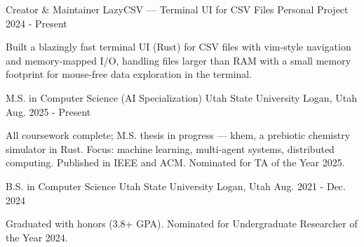 \documentclass[11pt, letterpaper]{awesome-cv}
\begin{document}
\begin{cventries}
  \cventry
    {Creator \& Maintainer}
    {LazyCSV --- Terminal UI for CSV Files}
    {Personal Project}
    {2024 - Present}
    {
      \begin{cvitems}
        \item {Built a blazingly fast terminal UI (Rust) for CSV files with vim-style navigation and memory-mapped I/O, handling files larger than RAM with a small memory footprint for mouse-free data exploration in the terminal.}
      \end{cvitems}
    }

\end{cventries}


\begin{cventries}

  \cventry
    {M.S. in Computer Science (AI Specialization)}
    {Utah State University}
    {Logan, Utah}
    {Aug. 2025 - Present}
    {
      \begin{cvitems}
        \item {All coursework complete; M.S. thesis in progress --- khem, a prebiotic chemistry simulator in Rust. Focus: machine learning, multi-agent systems, distributed computing. Published in IEEE and ACM. Nominated for TA of the Year 2025.}
      \end{cvitems}
    }

  \cventry
    {B.S. in Computer Science}
    {Utah State University}
    {Logan, Utah}
    {Aug. 2021 - Dec. 2024}
    {
      \begin{cvitems}
        \item {Graduated with honors (3.8+ GPA). Nominated for Undergraduate Researcher of the Year 2024.}
      \end{cvitems}
    }

\end{cventries}

\end{document}
